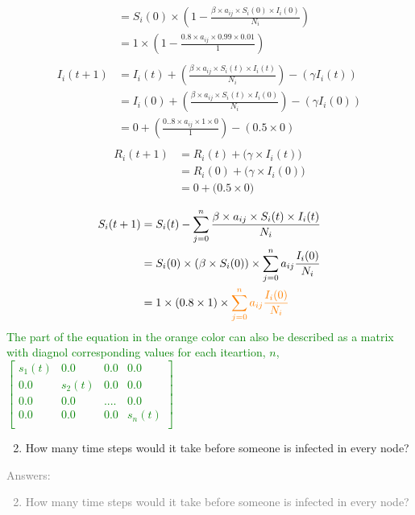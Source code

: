 \documentclass[11pt]{article}
\begin{document}
{\begin{enumerate}
{\begin{align*}
		&=	S_i(0) \times \left( 1 - \frac{\beta \times a_{ij} \times S_i(0) \times I_i(0)}{N_i}\right)\\
		&=	1  \times \left( 1- \frac{0.8 \times a_{ij} \times 0.99 \times 0.01}{1}\right)\\
\end{align*}
\begin{align*}
I_i(t+1) 	&=  I_i(t) + \left(\frac{\beta \times a_{ij} \times S_i(t) \times I_i(t)}{N_i}\right) - (\gamma I_i(t))\\
		&=	I_i(0) + \left(\frac{\beta \times a_{ij} \times S_i(t) \times I_i(0)}{N_i}\right) - (\gamma I_i(0))\\
		&=	0 + \left(\frac{0..8 \times a_{ij} \times 1 \times 0}{1}\right) - (0.5 \times 0)\\
\end{align*}
\begin{align*}
R_i(t+1) 	&=  R_i(t) + \big(\gamma \times I_i(t)\big)\\
		&=  R_i(0) + \big(\gamma \times I_i(0)\big)\\
		&=  0 + \big(0.5 \times 0 \big)\\
\end{align*}
}
\textcolor{green}{
\begin{align*}
S_i(t+1) 	&=  S_i(t) - \sum_{j=0}^{n} \frac{\beta \times a_{ij} \times S_i(t) \times I_i(t)}{N_i}\\
		&=	S_i(0) \times (\beta \times S_i(0)) \times \sum_{j=0}^{n}  a_{ij} \frac{I_i(0)}{N_i}\\
		&=	1 \times (0.8 \times 1) \times \textcolor{orange}{\sum_{j=0}^{n}  a_{ij} \frac{ I_i(0)}{N_i}}\\
\end{align*}
The part of the equation in the orange color can also be described as a matrix with diagnol corresponding values for each iteartion, $n$, 
$\begin{bmatrix} 
	s_1(t) & 0.0  & 0.0 & 0.0 \\
	0.0 & s_2(t)  & 0.0 & 0.0 \\
	0.0 & 0.0  & . . . .  & 0.0 \\
	0.0 & 0.0  & 0.0 & s_n(t) \\
\end{bmatrix}$\\
}
\end{enumerate}
}

\begin{enumerate}
	\setcounter{enumi}{1}
	\item How many time steps would it take before someone is infected in every node?
\end{enumerate}
\textcolor{gray}{
Answers:
\begin{enumerate}
	\setcounter{enumi}{1}
	\item How many time steps would it take before someone is infected in every node?
\end{enumerate}
}
\end{document}
